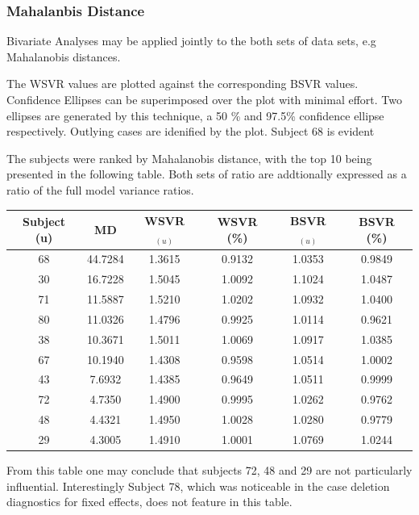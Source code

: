 \documentclass[12pt, a4paper]{report}
\theoremstyle{plain}
\theoremstyle{definition}
\theoremstyle{remark}
\begin{document}
	
	
	
	\subsubsection{Mahalanbis Distance}
	Bivariate Analyses may be applied jointly to the both sets of data sets, e.g Mahalanobis distances.
	
	The WSVR values are plotted against the corresponding BSVR values. Confidence Ellipses can be superimposed over the plot with minimal effort. Two ellipses are generated by this technique, a 50 \% and 97.5\% confidence ellipse respectively. Outlying cases are idenified by the plot. Subject 68 is evident
	
	The subjects were ranked by Mahalanobis distance, with the top 10 being presented in the following table. Both sets of ratio are addtionally expressed as a ratio of the full model variance ratios.
	\begin{center}
		\begin{tabular}{|c|c|c|c|c|c|}
			\hline
			Subject (u) &  MD & WSVR$_{(u)}$ & WSVR (\%) & BSVR$_{(u)}$   & BSVR (\%)     \\ \hline \hline
			68 & 44.7284   & 1.3615  & 0.9132   & 1.0353  & 0.9849 \\ \hline
			30 & 16.7228   & 1.5045  & 1.0092   & 1.1024  & 1.0487 \\ \hline
			71 & 11.5887   & 1.5210  & 1.0202   & 1.0932  & 1.0400 \\ \hline
			80 & 11.0326   & 1.4796  & 0.9925   & 1.0114  & 0.9621 \\ \hline
			38 & 10.3671   & 1.5011  & 1.0069   & 1.0917  & 1.0385 \\ \hline
			67 & 10.1940   & 1.4308  & 0.9598   & 1.0514  & 1.0002 \\ \hline
			43  & 7.6932   & 1.4385  & 0.9649   & 1.0511  & 0.9999 \\ \hline
			72  & 4.7350   & 1.4900  & 0.9995   & 1.0262  & 0.9762 \\ \hline
			48  & 4.4321   & 1.4950  & 1.0028   & 1.0280  & 0.9779 \\ \hline
			29  & 4.3005   & 1.4910  & 1.0001   & 1.0769  & 1.0244 \\ \hline
		\end{tabular}
	\end{center}
	From this table one may conclude that subjects 72, 48 and 29 are not particularly influential. Interestingly Subject 78, which was noticeable in the case deletion diagnostics for fixed effects, does not feature in this table.
	
\end{document}
